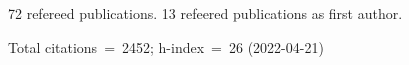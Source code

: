 72 refereed publications. 13 refeered publications as first author.

Total citations~=~2452; h-index~=~26 (2022-04-21)